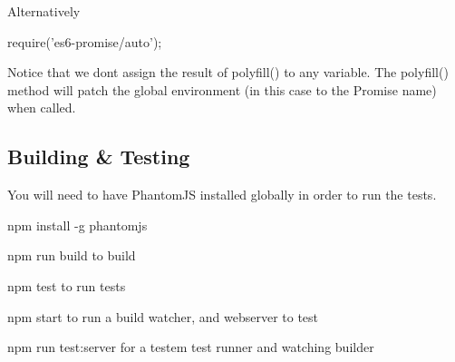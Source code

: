 Alternatively


\begin{DoxyCode}
require('es6-promise/auto');
\end{DoxyCode}


Notice that we don\textquotesingle{}t assign the result of {\ttfamily polyfill()} to any variable. The {\ttfamily polyfill()} method will patch the global environment (in this case to the {\ttfamily Promise} name) when called.

\subsection*{Building \& Testing}

You will need to have Phantom\+JS installed globally in order to run the tests.

{\ttfamily npm install -\/g phantomjs}


\begin{DoxyItemize}
\item {\ttfamily npm run build} to build
\item {\ttfamily npm test} to run tests
\item {\ttfamily npm start} to run a build watcher, and webserver to test
\item {\ttfamily npm run test\+:server} for a testem test runner and watching builder 
\end{DoxyItemize}